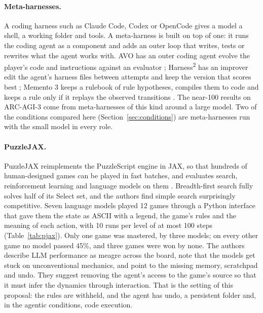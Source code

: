 \documentclass[11pt,a4paper]{article}
\newcommand{\hsq}{Harness\textsuperscript{2}}
\begin{document}
\paragraph{Meta-harnesses.}
A coding harness such as Claude Code, Codex or OpenCode gives a model a
shell, a working folder and tools. A meta-harness is built on top of one: it
runs the coding agent as a component and adds an outer loop that writes,
tests or rewrites what the agent works with. AVO has an outer coding agent
evolve the player's code and instructions against an evaluator
\citep{chen2026avo,nvidia2026avoarc}; \hsq{} has an improver edit the
agent's harness files between attempts and keep the version that scores best
\citep{xu2026harness2}; Memento 3 keeps a rulebook of rule hypotheses,
compiles them to code and keeps a rule only if it replays the observed
transitions \citep{zhao2026memento3}. The near-100 results on ARC-AGI-3 come
from meta-harnesses of this kind around a large model. Two of the conditions
compared here (Section~\ref{sec:conditions}) are meta-harnesses run with the
small model in every role.

\paragraph{PuzzleJAX.}
PuzzleJAX reimplements the PuzzleScript engine in JAX, so that hundreds of
human-designed games can be played in fast batches, and evaluates search,
reinforcement learning and language models on them
\citep{earle2025puzzlejax}. Breadth-first search fully solves half of its
Select set, and the authors find simple search surprisingly competitive.
Seven language models played 12 games through a Python interface that gave
them the state as ASCII with a legend, the game's rules and the meaning of
each action, with 10 runs per level of at most 100 steps
(Table~\ref{tab:pjax}). Only one game was mastered, by three models; on every
other game no model passed 45\%, and three games were won by none. The
authors describe LLM performance as meagre across the board, note that the
models get stuck on unconventional mechanics, and point to the missing
memory, scratchpad and undo. They suggest removing the
agent's access to the game's source so that it must infer the dynamics
through interaction. That is the setting of this proposal: the rules are
withheld, and the agent has undo, a persistent folder and, in the agentic
conditions, code execution.
\end{document}
